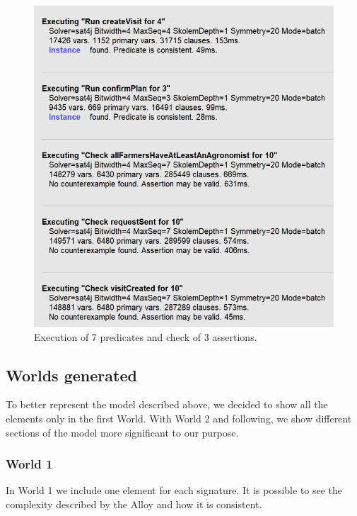 \begin{figure}[H]
\centering
\includegraphics[scale=0.4]{../AlloyCode/executionImages/execution_short2.png}
\caption{\label{fig:alloyExecution}Execution of 7 predicates and check of 3 assertions.}
\end{figure}

\newpage
\subsection{Worlds generated}
To better represent the model described above, we decided to show all the elements only in the first World. With World 2 and following, we show different sections of the model more significant to our purpose.

\subsubsection{World 1}
In World 1 we include one element for each signature. It is possible to see the complexity described by the Alloy and how it is consistent.

